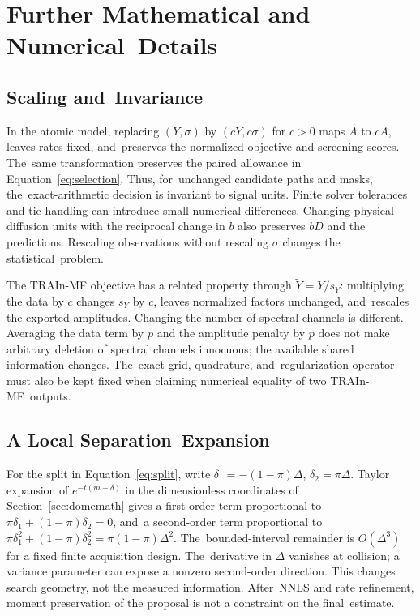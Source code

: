 \documentclass[mathematics,article,accept,moreauthors]{Definitions/mdpi}
\begin{document}
\appendixstart
\appendix
\renewcommand{\theHequation}{appendix.\arabic{equation}}
\renewcommand{\theHproposition}{appendix.\arabic{proposition}}
%


\section{Further Mathematical and Numerical~Details}

\subsection{Scaling and~Invariance}
In the atomic model, replacing $(Y,\sigma)$ by $(cY,c\sigma)$ for $c>0$ maps $A$ to $cA$, leaves rates fixed, and~preserves the normalized objective and screening scores. The~same transformation preserves the paired allowance in Equation~\eqref{eq:selection}. Thus, for~unchanged candidate paths and masks, the~exact-arithmetic decision is invariant to signal units. Finite solver tolerances and tie handling can introduce small numerical differences. Changing physical diffusion units with the reciprocal change in $b$ also preserves $bD$ and the predictions. Rescaling observations without rescaling $\sigma$ changes the statistical~problem.

The TRAIn-MF objective has a related property through $\widetilde Y=Y/s_Y$: multiplying the data by $c$ changes $s_Y$ by $c$, leaves normalized factors unchanged, and~rescales the exported amplitudes. Changing the number of spectral channels is different. Averaging the data term by $p$ and the amplitude penalty by $p$ does not make arbitrary deletion of spectral channels innocuous; the available shared information changes. The~exact grid, quadrature, and~regularization operator must also be kept fixed when claiming numerical equality of two TRAIn-MF~outputs.

\subsection{A Local Separation~Expansion}
For the split in Equation~\eqref{eq:split}, write $\delta_1=-(1-\pi)\Delta$, $\delta_2=\pi\Delta$. Taylor expansion of $e^{-t(m+\delta)}$ in the dimensionless coordinates of Section~\ref{sec:domemath} gives a first-order term proportional to $\pi\delta_1+(1-\pi)\delta_2=0$, and~a second-order term proportional to \mbox{$\pi\delta_1^2+(1-\pi)\delta_2^2=\pi(1-\pi)\Delta^2$.} The~bounded-interval remainder is $O(\Delta^3)$ for a fixed finite acquisition design. The~derivative in $\Delta$ vanishes at collision; a variance parameter can expose a nonzero second-order direction. This changes search geometry, not the measured information. After~NNLS and rate refinement, moment preservation of the proposal is not a constraint on the final~estimate.
\end{document}
